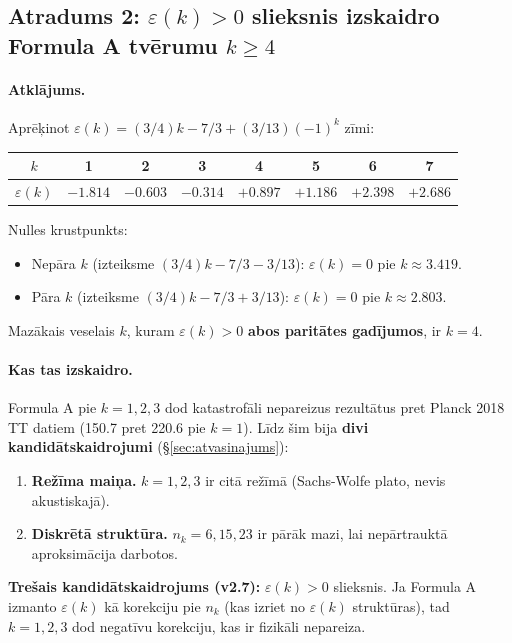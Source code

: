 \documentclass[12pt,a4paper]{article}
\begin{document}
\subsection*{Atradums 2: $\varepsilon(k) > 0$ slieksnis izskaidro Formula A tvērumu $k \geq 4$}

\paragraph{Atklājums.}
Aprēķinot $\varepsilon(k) = (3/4)k - 7/3 + (3/13)(-1)^k$ zīmi:

\begin{table}[h]
\centering
\begin{tabular}{|c|c|c|c|c|c|c|c|}
\hline
$k$ & 1 & 2 & 3 & 4 & 5 & 6 & 7 \\
\hline
$\varepsilon(k)$ & $-1.814$ & $-0.603$ & $-0.314$ & $+0.897$ & $+1.186$ & $+2.398$ & $+2.686$ \\
\hline
\end{tabular}
\end{table}

Nulles krustpunkts:
\begin{itemize}
    \item Nepāra $k$ (izteiksme $(3/4)k - 7/3 - 3/13$): $\varepsilon(k) = 0$ pie $k \approx 3.419$.
    \item Pāra $k$ (izteiksme $(3/4)k - 7/3 + 3/13$): $\varepsilon(k) = 0$ pie $k \approx 2.803$.
\end{itemize}

Mazākais veselais $k$, kuram $\varepsilon(k) > 0$ \textbf{abos paritātes gadījumos}, ir $k = 4$.

\paragraph{Kas tas izskaidro.}
Formula A pie $k=1,2,3$ dod katastrofāli nepareizus rezultātus pret Planck 2018 TT datiem (150.7 pret 220.6 pie $k=1$). Līdz šim bija \textbf{divi kandidātskaidrojumi} (\S\ref{sec:atvasinajums}):
\begin{enumerate}
    \item \textbf{Režīma maiņa.} $k=1,2,3$ ir citā režīmā (Sachs-Wolfe plato, nevis akustiskajā).
    \item \textbf{Diskrētā struktūra.} $n_k = 6, 15, 23$ ir pārāk mazi, lai nepārtrauktā aproksimācija darbotos.
\end{enumerate}

\textbf{Trešais kandidātskaidrojums (v2.7):} $\varepsilon(k) > 0$ slieksnis. Ja Formula A izmanto $\varepsilon(k)$ kā korekciju pie $n_k$ (kas izriet no $\varepsilon(k)$ struktūras), tad $k=1,2,3$ dod negatīvu korekciju, kas ir fizikāli nepareiza.
\end{document}
